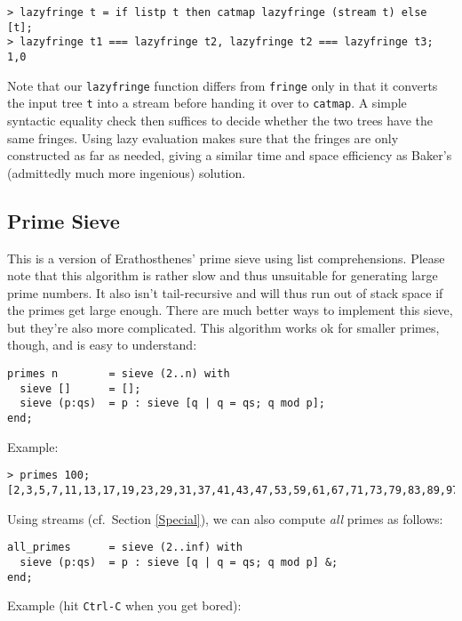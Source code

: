 \documentclass[a4paper,12pt]{article}
\begin{document}
\begin{lstlisting}
> lazyfringe t = if listp t then catmap lazyfringe (stream t) else [t];
> lazyfringe t1 === lazyfringe t2, lazyfringe t2 === lazyfringe t3;
1,0
\end{lstlisting}

Note that our \lstinline{lazyfringe} function differs from \lstinline{fringe} only in that it converts the input tree \verb|t| into a stream before handing it over to \lstinline{catmap}. A simple syntactic equality check then suffices to decide whether the two trees have the same fringes. Using lazy evaluation makes sure that the fringes are only constructed as far as needed, giving a similar time and space efficiency as Baker's (admittedly much more ingenious) solution.

\subsection{Prime Sieve}

This is a version of Erathosthenes' prime sieve using list comprehensions.
Please note that this algorithm is rather slow and thus unsuitable for
generating large prime numbers. It also isn't tail-recursive and will thus run
out of stack space if the primes get large enough. There are much better ways
to implement this sieve, but they're also more complicated. This algorithm
works ok for smaller primes, though, and is easy to understand:

\begin{lstlisting}
primes n        = sieve (2..n) with
  sieve []      = [];
  sieve (p:qs)  = p : sieve [q | q = qs; q mod p];
end;
\end{lstlisting}

\noindent Example:

\begin{lstlisting}
> primes 100;
[2,3,5,7,11,13,17,19,23,29,31,37,41,43,47,53,59,61,67,71,73,79,83,89,97]
\end{lstlisting}

\noindent Using streams (cf.\ Section \ref{Special}), we can also compute \emph{all} primes as follows:

\begin{lstlisting}
all_primes      = sieve (2..inf) with
  sieve (p:qs)  = p : sieve [q | q = qs; q mod p] &;
end;
\end{lstlisting}

\noindent Example (hit \verb|Ctrl-C| when you get bored):
\end{document}
